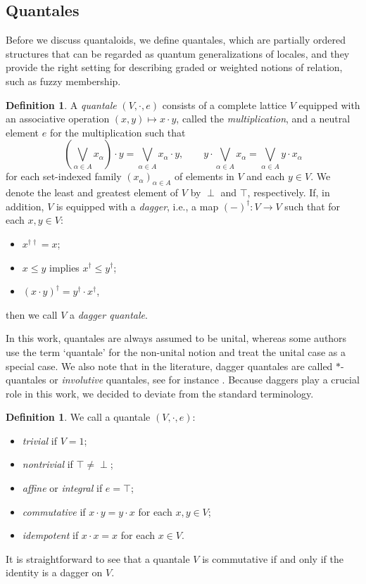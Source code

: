 \documentclass[12pt]{tac}
\theoremstyle{definition}
\newtheorem{definition}[theorem]{Definition}
\theoremstyle{remark}
\newcommand{\<}{\langle}
\renewcommand{\>}{\rangle}
\renewcommand{\:}{\colon}
\begin{document}
\subsection{Quantales}
Before we discuss quantaloids, we define quantales, which are partially ordered structures that can be regarded as quantum generalizations of locales, and they provide the right setting for describing graded or weighted notions of relation, such as fuzzy membership.
 \begin{definition}\label{def:quantales}
     A \emph{quantale} $(V,\cdot,e)$ consists of a complete lattice $V$ equipped with an associative operation $(x,y)\mapsto x\cdot y$, called the \emph{multiplication}, and  a neutral element $e$ for the multiplication such that 
     \[ \left(\bigvee_{\alpha\in A}x_\alpha\right)\cdot  y=\bigvee_{\alpha\in A}x_\alpha\cdot y, \qquad y\cdot\bigvee_{\alpha\in A}x_\alpha=\bigvee_{\alpha\in A}y\cdot x_\alpha\]
     for each set-indexed family $(x_\alpha)_{\alpha\in A}$ of elements in $V$ and each $y\in V$. We denote the least and greatest element of $V$ by $\perp$ and $\top$, respectively. If, in addition,  $V$ is equipped with a \emph{dagger}, i.e., a map $(-)^\dag:V\to V$ 
     such that for each $x,y\in V$:
     \begin{itemize}
         \item $x^{\dag\dag}=x$;
         \item $x\leq y$ implies $x^\dag\leq y^\dag$;\item $(x\cdot y)^\dag=y^\dag\cdot x^\dag$,
     \end{itemize}
     then we call $V$ a \emph{dagger quantale}.
     \end{definition}
In this work, quantales are always assumed to be unital, whereas some authors use the term `quantale' for the non-unital notion and treat the unital case as a special case. We also note that in the literature, dagger quantales are called $*$-quantales or \emph{involutive} quantales, see for instance \cite{Heymans-Stubbe-2}. Because daggers play a crucial role in this work, we decided to deviate from the standard terminology. 

     
\begin{definition}
        We call a quantale $(V,\cdot,e)$:
     \begin{itemize} 
     \item \emph{trivial} if $V=1$;
     \item \emph{nontrivial} if $\top\neq\perp$;
     \item \emph{affine} or \emph{integral} if $e=\top$;
    \item \emph{commutative} if $x\cdot y=y\cdot x$ for each $x,y\in V$;
    \item \emph{idempotent} if $x\cdot x=x$ for each $x\in V$.
    \end{itemize}
    \end{definition}
    It is straightforward to see that a quantale $V$ is commutative if and only if the identity is a dagger on $V$.
\end{document}
